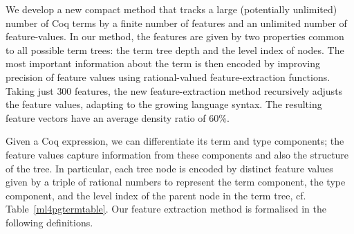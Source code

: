 We develop a new compact method that tracks a large (potentially unlimited) number of Coq terms by a finite number of features and an unlimited number of feature-values.
In our method, the features are given by two properties common to all possible term trees: the term tree depth and the level index of nodes.
The most important information about the term is then encoded by improving precision of feature values %
using rational-valued feature-extraction functions. Taking just $300$ features, the new feature-extraction method recursively adjusts the feature values, 
adapting to the growing language syntax. %
The resulting feature vectors have an average density ratio of 60\%.   

Given a Coq expression, we can differentiate its term and type components; the feature values capture information from
these components and also the structure of the tree. In particular, each tree node is encoded by distinct feature values
given by a triple of rational numbers to represent the term component, the type component, and the level index of the parent node in the term tree,
cf. Table~\ref{ml4pgtermtable}. Our feature extraction method is formalised in the following definitions.

\begin{table}[t]
\end{table}


